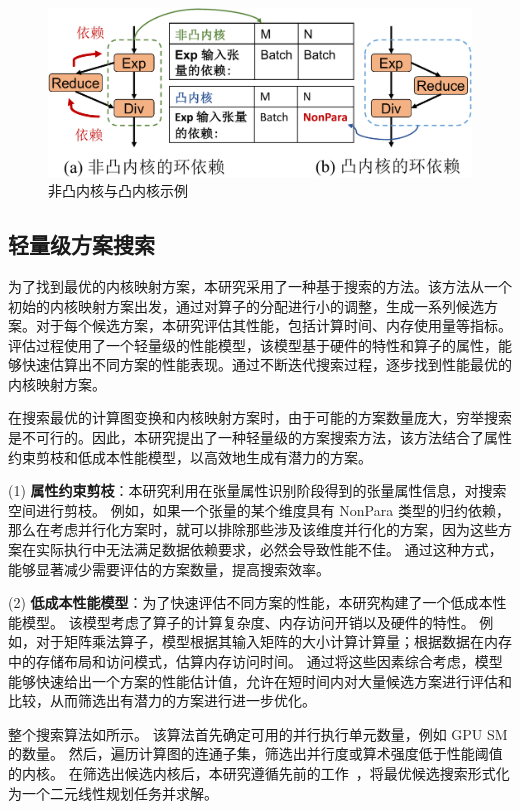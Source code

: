 \begin{figure}[ht]
    \centering
    \includegraphics[width=0.6\linewidth]{figures/flashtensor/kernel_identification-crop.pdf}
    \caption{非凸内核与凸内核示例}
    \label{fig:kernel_def_diff}
\end{figure}


\subsection{轻量级方案搜索}
为了找到最优的内核映射方案，本研究采用了一种基于搜索的方法。该方法从一个初始的内核映射方案出发，通过对算子的分配进行小的调整，生成一系列候选方案。对于每个候选方案，本研究评估其性能，包括计算时间、内存使用量等指标。评估过程使用了一个轻量级的性能模型，该模型基于硬件的特性和算子的属性，能够快速估算出不同方案的性能表现。通过不断迭代搜索过程，逐步找到性能最优的内核映射方案。

在搜索最优的计算图变换和内核映射方案时，由于可能的方案数量庞大，穷举搜索是不可行的。因此，本研究提出了一种轻量级的方案搜索方法，该方法结合了属性约束剪枝和低成本性能模型，以高效地生成有潜力的方案。

(1) \textbf{属性约束剪枝}：本研究利用在张量属性识别阶段得到的张量属性信息，对搜索空间进行剪枝。
例如，如果一个张量的某个维度具有 NonPara 类型的归约依赖，那么在考虑并行化方案时，就可以排除那些涉及该维度并行化的方案，因为这些方案在实际执行中无法满足数据依赖要求，必然会导致性能不佳。
通过这种方式，能够显著减少需要评估的方案数量，提高搜索效率。

(2) \textbf{低成本性能模型}：为了快速评估不同方案的性能，本研究构建了一个低成本性能模型。
该模型考虑了算子的计算复杂度、内存访问开销以及硬件的特性。
例如，对于矩阵乘法算子，模型根据其输入矩阵的大小计算计算量；根据数据在内存中的存储布局和访问模式，估算内存访问时间。
通过将这些因素综合考虑，模型能够快速给出一个方案的性能估计值，允许在短时间内对大量候选方案进行评估和比较，从而筛选出有潜力的方案进行进一步优化。


整个搜索算法如所示。
该算法首先确定可用的并行执行单元数量，例如 GPU SM的数量。
然后，遍历计算图的连通子集，筛选出并行度或算术强度低于性能阈值的内核。
在筛选出候选内核后，本研究遵循先前的工作~\cite{hu2024korch}，将最优候选搜索形式化为一个二元线性规划任务并求解。

